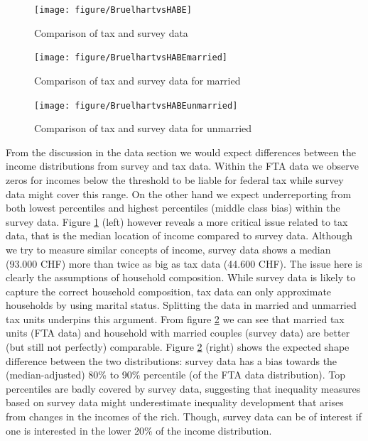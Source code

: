 \documentclass[twoside]{article}\usepackage[]{graphicx}\usepackage[]{color}
\newenvironment{knitrout}{}{} %
\begin{document}
\begin{multicols}{2}
\begin{knitrout}
\begin{figure}[H]
\texttt{[image: figure/BruelhartvsHABE]} \caption[Comparison of tax and survey data]{Comparison of tax and survey data\label{fig:BruelhartvsHABE}}
\end{figure}


\end{knitrout}


\begin{knitrout}
\color{fgcolor}\begin{figure}[H]

\texttt{[image: figure/BruelhartvsHABEmarried]} \caption[Comparison of tax and survey data for married]{Comparison of tax and survey data for married\label{fig:BruelhartvsHABEmarried}}
\end{figure}


\end{knitrout}


\begin{knitrout}
\color{fgcolor}\begin{figure}[H]

\texttt{[image: figure/BruelhartvsHABEunmarried]} \caption[Comparison of tax and survey data for unmarried]{Comparison of tax and survey data for unmarried\label{fig:BruelhartvsHABEunmarried}}
\end{figure}


\end{knitrout}

From the discussion in the data section we would expect differences between the income distributions from survey and tax data. Within the FTA data we observe zeros for incomes below the threshold to be liable for federal tax while survey data might cover this range. On the other hand we expect underreporting from both lowest percentiles and highest percentiles (middle class bias) within the survey data. Figure \ref{fig:BruelhartvsHABE} (left) however reveals a more critical issue related to tax data, that is the median location of income compared to survey data. Although we try to measure similar concepts of income, survey data shows a median (93.000 CHF) more than twice as big as tax data (44.600 CHF). The issue here is clearly the assumptions of household composition. While survey data is likely to capture the correct household composition, tax data can only approximate households by using marital status. Splitting the data in married and unmarried tax units underpins this argument. From figure \ref{fig:BruelhartvsHABEmarried} we can see that married tax units (FTA data) and household with married couples (survey data) are better (but still not perfectly) comparable. Figure \ref{fig:BruelhartvsHABEmarried} (right) shows the expected shape difference between the two distributions:  survey data has a bias towards the (median-adjusted) 80\% to 90\% percentile (of the FTA data distribution). Top percentiles are badly covered by survey data, suggesting that inequality measures based on survey data might underestimate inequality development that arises from changes in the incomes of the rich. Though, survey data can be of interest if one is interested in the lower 20\% of the income distribution. 


\end{multicols}
\end{document}

